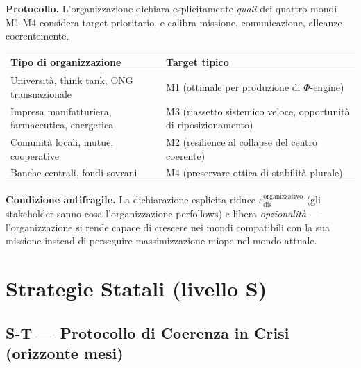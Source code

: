 \Hypoth{} \textbf{Protocollo.} L'organizzazione dichiara esplicitamente
\emph{quali} dei quattro mondi M1-M4 considera target prioritario, e
calibra missione, comunicazione, alleanze coerentemente.

{\def\LTcaptype{none} %
{\small\begin{longtable}[]{@{}
  >{\raggedright\arraybackslash}p{}
  >{\raggedright\arraybackslash}p{}@{}}
\toprule\noalign{}
\begin{minipage}[b]{\linewidth}\raggedright
Tipo di organizzazione
\end{minipage} & \begin{minipage}[b]{\linewidth}\raggedright
Target tipico
\end{minipage} \\
\midrule\noalign{}
\endhead
\bottomrule\noalign{}
\endlastfoot
Università, think tank, ONG transnazionale & M1 (ottimale per produzione
di \(\Phi\)-engine) \\
Impresa manifatturiera, farmaceutica, energetica & M3 (riassetto
sistemico veloce, opportunità di riposizionamento) \\
Comunità locali, mutue, cooperative & M2 (resilience al collapse del
centro coerente) \\
Banche centrali, fondi sovrani & M4 (preservare ottica di stabilità
plurale) \\
\end{longtable}}
}

\Proved{} \textbf{Condizione antifragile.} La dichiarazione esplicita
riduce \(\varepsilon_{\text{dis}}^{\text{organizzativo}}\) (gli
stakeholder sanno cosa l'organizzazione perfollows) e libera
\emph{opzionalità} --- l'organizzazione si rende capace di crescere nei
mondi compatibili con la sua missione instead di perseguire
massimizzazione miope nel mondo attuale.



\section{Strategie Statali (livello
S)}\label{strategie-statali-livello-s}

\subsection{S-T --- Protocollo di Coerenza in Crisi (orizzonte
mesi)}\label{s-t-protocollo-di-coerenza-in-crisi-orizzonte-mesi}

